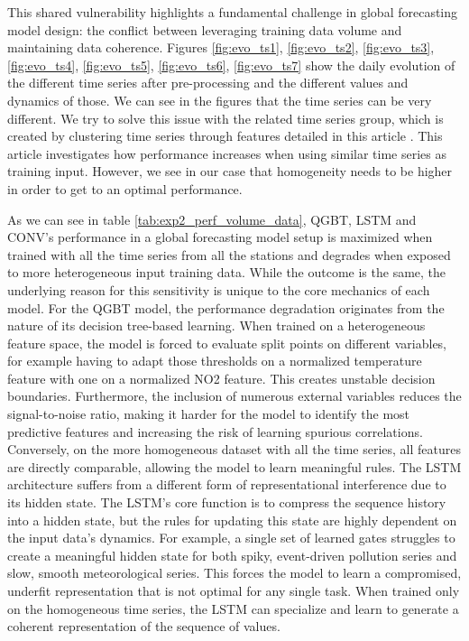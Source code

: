 \documentclass[12pt,a4paper]{book}
\begin{document}
This shared vulnerability highlights a fundamental challenge in global forecasting model design: the conflict between leveraging training data volume and maintaining data coherence. Figures \ref{fig:evo_ts1}, \ref{fig:evo_ts2}, \ref{fig:evo_ts3}, \ref{fig:evo_ts4}, \ref{fig:evo_ts5}, \ref{fig:evo_ts6}, \ref{fig:evo_ts7} show the daily evolution of the different time series after pre-processing and the different values and dynamics of those. We can see in the figures that the time series can be very different. We try to solve this issue with the related time series group, which is created by clustering time series through features detailed in this article \cite{bandara_forecasting_2020}. This article investigates how performance increases when using similar time series as training input. However, we see in our case that homogeneity needs to be higher in order to get to an optimal performance.

As we can see in table \ref{tab:exp2_perf_volume_data}, QGBT, LSTM and CONV's performance in a global forecasting model setup is maximized when trained with all the \no{} time series from all the stations and degrades when exposed to more heterogeneous input training data. While the outcome is the same, the underlying reason for this sensitivity is unique to the core mechanics of each model. 
For the QGBT model, the performance degradation originates from the nature of its decision tree-based learning. When trained on a heterogeneous feature space, the model is forced to evaluate split points on different variables, for example having to adapt those thresholds on a normalized temperature feature with one on a normalized NO2 feature. This creates unstable decision boundaries. Furthermore, the inclusion of numerous external variables reduces the signal-to-noise ratio, making it harder for the model to identify the most predictive features and increasing the risk of learning spurious correlations. Conversely, on the more homogeneous dataset with all the \no{} time series, all features are directly comparable, allowing the model to learn meaningful rules.
The LSTM architecture suffers from a different form of representational interference due to its hidden state. The LSTM's core function is to compress the sequence history into a hidden state, but the rules for updating this state are highly dependent on the input data's dynamics. For example, a single set of learned gates struggles to create a meaningful hidden state for both spiky, event-driven pollution series and slow, smooth meteorological series. This forces the model to learn a compromised, underfit representation that is not optimal for any single task. When trained only on the homogeneous \no{} time series, the LSTM can specialize and learn to generate a coherent representation of the \no{} sequence of values.
\end{document}
